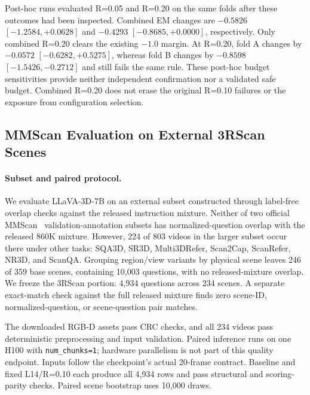 Post-hoc runs evaluated R=0.05 and R=0.20 on the same folds after these outcomes had been inspected. Combined EM changes are $-0.5826$ $[-1.2584,+0.0628]$ and $-0.4293$ $[-0.8685,+0.0000]$, respectively. Only combined R=0.20 clears the existing $-1.0$ margin. At R=0.20, fold A changes by $-0.0572$ $[-0.6282,+0.5275]$, whereas fold B changes by $-0.8598$ $[-1.5426,-0.2712]$ and still fails the same rule. These post-hoc budget sensitivities provide neither independent confirmation nor a validated safe budget. Combined R=0.20 does not erase the original R=0.10 failures or the exposure from configuration selection.

\subsection{MMScan Evaluation on External 3RScan Scenes}
\label{sec:supp_mmscan}
\paragraph{Subset and paired protocol.} We evaluate LLaVA-3D-7B on an external subset constructed through label-free overlap checks against the released instruction mixture. Neither of two official MMScan~\citep{lyu2024mmscan} validation-annotation subsets has normalized-question overlap with the released 860K mixture. However, 224 of 803 videos in the larger subset occur there under other tasks: SQA3D, SR3D, Multi3DRefer, Scan2Cap, ScanRefer, NR3D, and ScanQA. Grouping region/view variants by physical scene leaves 246 of 359 base scenes, containing 10,003 questions, with no released-mixture overlap. We freeze the 3RScan portion: 4,934 questions across 234 scenes. A separate exact-match check against the full released mixture finds zero scene-ID, normalized-question, or scene-question pair matches.

The downloaded RGB-D assets pass CRC checks, and all 234 videos pass deterministic preprocessing and input validation. Paired inference runs on one H100 with \texttt{num\_chunks=1}; hardware parallelism is not part of this quality endpoint. Inputs follow the checkpoint's actual 20-frame contract. Baseline and fixed L14/R=0.10 each produce all 4,934 rows and pass structural and scoring-parity checks. Paired scene bootstrap uses 10,000 draws.

